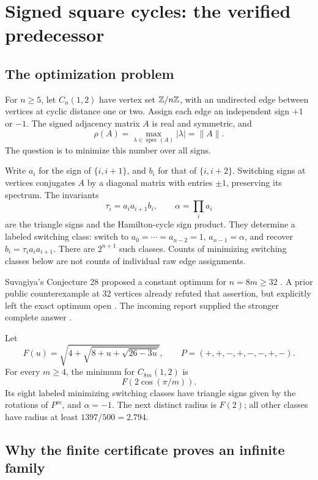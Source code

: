 \section{Signed square cycles: the verified predecessor}
\label{sec:graphs}

\subsection{The optimization problem}

For \(n\ge5\), let \(C_n(1,2)\) have vertex set \(\mathbb Z/n\mathbb Z\), with an
undirected edge between vertices at cyclic distance one or two. Assign
each edge an independent sign \(+1\) or \(-1\). The signed adjacency matrix
\(A\) is real and symmetric, and
\[
\rho(A)=\max_{\lambda\in\operatorname{spec}(A)}|\lambda|=\|A\|.
\]
The question is to minimize this number over all signs.

Write \(a_i\) for the sign of \(\{i,i+1\}\), and \(b_i\) for that of
\(\{i,i+2\}\). Switching signs at vertices conjugates \(A\) by a diagonal
matrix with entries \(\pm1\), preserving its spectrum. The invariants
\[
\tau_i=a_i a_{i+1}b_i,\qquad \alpha=\prod_i a_i
\]
are the triangle signs and the Hamilton-cycle sign product. They determine
a labeled switching class: switch to \(a_0=\cdots=a_{n-2}=1\),
\(a_{n-1}=\alpha\), and recover \(b_i=\tau_i a_i a_{i+1}\).
There are \(2^{n+1}\) such classes. Counts of minimizing switching classes
below are not counts of individual raw edge assignments.

Suvagiya's Conjecture 28 proposed a constant optimum for \(n=8m\ge32\)
\cite{Suvagiya}. A prior public counterexample at \(32\) vertices already
refuted that assertion, but explicitly left the exact optimum open
\cite{Trure}. The incoming report supplied the stronger complete answer
\cite{IncomingCycle}.

\begin{theorem}
\label{th:priorcycle}
Let
\[
F(u)=\sqrt{4+\sqrt{8+u+\sqrt{26-3u}}},\qquad
P=(+,+,-,+,-,-,+,-).
\]
For every \(m\ge4\), the minimum for \(C_{8m}(1,2)\) is
\[
F(2\cos(\pi/m)).
\]
Its eight labeled minimizing switching classes have triangle signs given
by the rotations of \(P^m\), and \(\alpha=-1\).
The next distinct radius is \(F(2)\); all other classes have
radius at least \(1397/500=2.794\).
\end{theorem}

\subsection{Why the finite certificate proves an infinite family}


